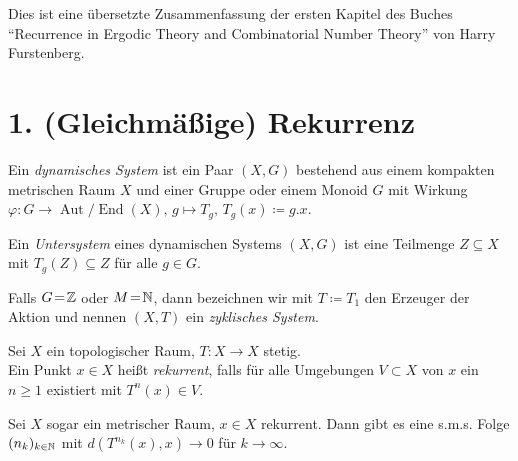 \documentclass{cheat-sheet}
\DeclareMathOperator{\Aut}{Aut} %
\DeclareMathOperator{\End}{End} %
\newcommand{\AutEnd}{\Aut\!/\!\End} %
\begin{document}


Dies ist eine übersetzte Zusammenfassung der ersten Kapitel des Buches "`Recurrence in Ergodic Theory and Combinatorial Number Theory"' von Harry Furstenberg.


\section{1. (Gleichmäßige) Rekurrenz}


\begin{defn}
  Ein \emph{dynamisches System} ist ein Paar $(X, G)$ bestehend aus einem kompakten metrischen Raum $X$ und einer Gruppe oder einem Monoid $G$ mit Wirkung
  $\varphi : G \to \AutEnd(X), \, g \mapsto T_g, \, T_g(x) \coloneqq g.x$.
\end{defn}

\begin{defn}
  Ein \emph{Untersystem} eines dynamischen Systems $(X, G)$ ist eine Teilmenge $Z \subseteq X$ mit $T_g(Z) \subseteq Z$ für alle $g \in G$.
\end{defn}

\begin{bem}
  Falls $G \!=\! \mathbb{Z}$ oder $M \!=\! \mathbb{N}$, dann bezeichnen wir mit $T \coloneqq T_1$ den Erzeuger der Aktion und nennen $(X, T)$ ein \emph{zyklisches System}.
\end{bem}

\begin{defn}
  Sei $X$ ein topologischer Raum, $T : X \to X$ stetig. \\
  Ein Punkt $x \in X$ heißt \emph{rekurrent}, falls für alle Umgebungen $V \subset X$ von $x$ ein $n \geq 1$ existiert mit $T^n(x) \in V$.
\end{defn}

\begin{bem}
  Sei $X$ sogar ein metrischer Raum, $x \in X$ rekurrent.
  Dann gibt es eine s.m.s. Folge $(n_k)_{k \in \mathbb{N}}$ mit $d(T^{n_k}(x), x) \to 0$ für $k \to \infty$.
\end{bem}
\end{document}
